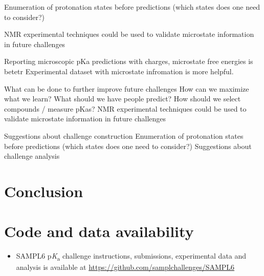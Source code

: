 \documentclass[9pt,lineno,final]{elife}
\newcommand{\pKa}{p\textit{K}\textsubscript{a}}
\begin{document}

Enumeration of protonation states before predictions (which states does one need to consider?)


NMR experimental techniques could be used to validate microstate information in future challenges

Reporting microscopic pKa predictions with charges, microstate free energies is betetr
Experimental dataset with microstate infromation is more helpful.

What can be done to further improve future challenges
How can we maximize what we learn?
What should we have people predict?
How should we select compounds / measure pKas? NMR experimental techniques could be used to validate microstate information in future challenges

Suggestions about challenge construction
Enumeration of protonation states before predictions (which states does one need to consider?)
Suggestions about challenge analysis
















\section{Conclusion}


\section{Code and data availability}
\begin{minipage}{15cm}
\begin{itemize}

\item SAMPL6 \pKa{} challenge instructions, submissions, experimental data and analysis is available at  \href{https://github.com/samplchallenges/SAMPL6}{https://github.com/samplchallenges/SAMPL6}

\end{itemize}
\end{minipage}
\end{document}
